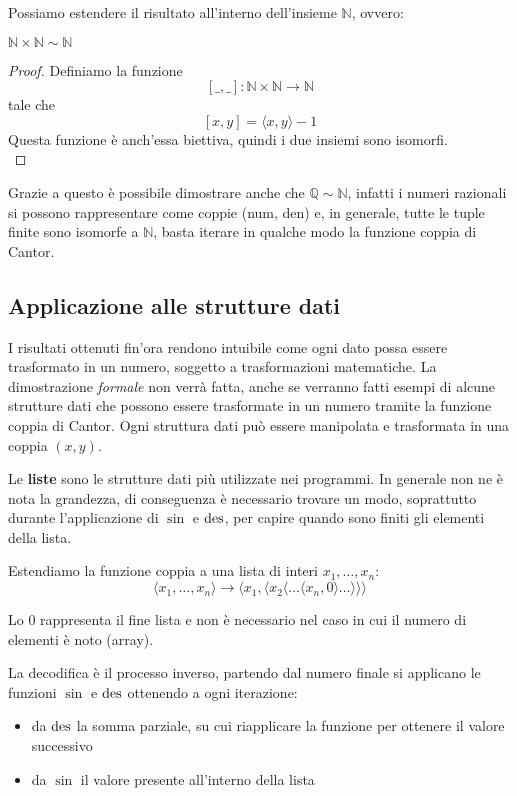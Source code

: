 Possiamo estendere il risultato all'interno dell'insieme $\mathbb{N}$, ovvero:

\begin{theor}
	$\mathbb{N} \times \mathbb{N} \sim \mathbb{N}$
\end{theor}
\begin{proof}
	Definiamo la funzione 
	$$ [\_ , \_]: \mathbb{N} \times \mathbb{N} \rightarrow \mathbb{N} $$
	tale che
	$$ [x,y] = \langle x,y \rangle - 1$$
	Questa funzione è anch'essa biettiva, quindi i due insiemi sono isomorfi. \\
\end{proof}

Grazie a questo è possibile dimostrare anche che $\mathbb{Q} \sim \mathbb{N}$, infatti i numeri razionali si possono rappresentare come coppie (num, den) e, in generale, tutte le tuple finite sono isomorfe a $\mathbb{N}$, basta iterare in qualche modo la funzione coppia di Cantor.

\subsection{Applicazione alle strutture dati}

I risultati ottenuti fin'ora rendono intuibile come ogni dato possa essere trasformato in un numero, soggetto a trasformazioni matematiche. La dimostrazione \textit{formale} non verrà fatta, anche se verranno fatti esempi di alcune strutture dati che possono essere trasformate in un numero tramite la funzione coppia di Cantor. Ogni struttura dati può essere manipolata e trasformata in una coppia $(x,y)$.

Le \textbf{liste} sono le strutture dati più utilizzate nei programmi. In generale non ne è nota la grandezza, di conseguenza è necessario trovare un modo, soprattutto durante l'applicazione di $\sin$ e $\operatorname{des}$, per capire quando sono finiti gli elementi della lista.

Estendiamo la funzione coppia a una lista di interi $x_1, \dots, x_n$:
$$ \langle x_1, \dots, x_n \rangle \rightarrow \langle x_1, \langle x_2 \langle \dots \langle x_n, 0 \rangle \dots \rangle \rangle \rangle $$

Lo $0$ rappresenta il fine lista e non è necessario nel caso in cui il numero di elementi è noto (array).

La decodifica è il processo inverso, partendo dal numero finale si applicano le funzioni $\sin$ e $\operatorname{des}$ ottenendo a ogni iterazione: 
\begin{itemize}
	\item da $\operatorname{des}$ la somma parziale, su cui riapplicare la funzione per ottenere il valore successivo
	
    \item da $\sin$ il valore presente all'interno della lista
\end{itemize} 

